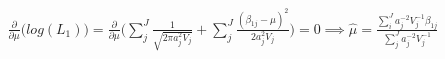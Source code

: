 \begin{multline}
\frac{\partial}{\partial \mu}\Big(log(L_1)\Big) =
\frac{\partial}{\partial \mu} \Big(\sum\limits_j^J \frac{1}{\sqrt{2 \pi a_j^2 V_j}} + \sum\limits_j^J \frac{(\beta_{1j} - \mu)^2}{2 a_j^2V_j}\Big) = 0
\implies \hat{\mu} = \frac{\sum\limits_i^J a_j^{-2}V_j^{-1}\beta_{1j}}{\sum\limits_j^J a_j^{-2}V_j^{-1}}
\end{multline}